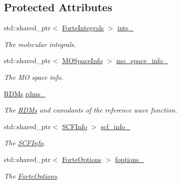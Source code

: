 \subsection*{Protected Attributes}
\begin{DoxyCompactItemize}
\item 
std\+::shared\+\_\+ptr$<$ \mbox{\hyperlink{classforte_1_1_forte_integrals}{Forte\+Integrals}} $>$ \mbox{\hyperlink{classforte_1_1_dynamic_correlation_solver_a839aab2128d02f4a5c9e3a15cd6c4c00}{ints\+\_\+}}
\begin{DoxyCompactList}\small\item\em The molecular integrals. \end{DoxyCompactList}\item 
std\+::shared\+\_\+ptr$<$ \mbox{\hyperlink{classforte_1_1_m_o_space_info}{M\+O\+Space\+Info}} $>$ \mbox{\hyperlink{classforte_1_1_dynamic_correlation_solver_aa9356222050b3dbbf67483338434fa01}{mo\+\_\+space\+\_\+info\+\_\+}}
\begin{DoxyCompactList}\small\item\em The MO space info. \end{DoxyCompactList}\item 
\mbox{\hyperlink{classforte_1_1_r_d_ms}{R\+D\+Ms}} \mbox{\hyperlink{classforte_1_1_dynamic_correlation_solver_a4b8e42e0c8ddbacdd12a70dbad089f17}{rdms\+\_\+}}
\begin{DoxyCompactList}\small\item\em The \mbox{\hyperlink{classforte_1_1_r_d_ms}{R\+D\+Ms}} and cumulants of the reference wave function. \end{DoxyCompactList}\item 
std\+::shared\+\_\+ptr$<$ \mbox{\hyperlink{classforte_1_1_s_c_f_info}{S\+C\+F\+Info}} $>$ \mbox{\hyperlink{classforte_1_1_dynamic_correlation_solver_a4e278d36f4dae4c3828f351561748c6e}{scf\+\_\+info\+\_\+}}
\begin{DoxyCompactList}\small\item\em The \mbox{\hyperlink{classforte_1_1_s_c_f_info}{S\+C\+F\+Info}}. \end{DoxyCompactList}\item 
std\+::shared\+\_\+ptr$<$ \mbox{\hyperlink{classforte_1_1_forte_options}{Forte\+Options}} $>$ \mbox{\hyperlink{classforte_1_1_dynamic_correlation_solver_aab1c4954021b18452cdd0d6a681473ee}{foptions\+\_\+}}
\begin{DoxyCompactList}\small\item\em The \mbox{\hyperlink{classforte_1_1_forte_options}{Forte\+Options}}. \end{DoxyCompactList}\item 

\end{DoxyCompactItemize}
